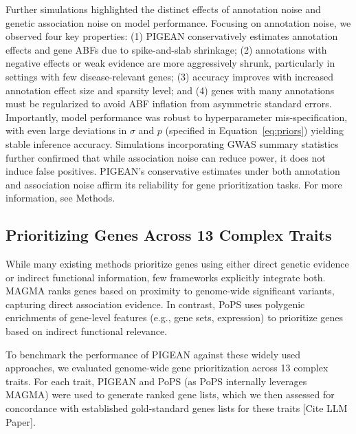 \documentclass[sn-nature,lineno]{sn-jnl}%
\theoremstyle{thmstyleone}%
\theoremstyle{thmstyletwo}%
\theoremstyle{thmstylethree}%
\begin{document}
Further simulations highlighted the distinct effects of annotation noise and genetic association noise on model performance. Focusing on annotation noise, we observed four key properties: (1) PIGEAN conservatively estimates annotation effects and gene ABFs due to spike-and-slab shrinkage; (2) annotations with negative effects or weak evidence are more aggressively shrunk, particularly in settings with few disease-relevant genes; (3) accuracy improves with increased annotation effect size and sparsity level; and (4) genes with many annotations must be regularized to avoid ABF inflation from asymmetric standard errors. Importantly, model performance was robust to hyperparameter mis-specification, with even large deviations in $\sigma$ and $p$ (specified in Equation~\ref{eq:priors}) yielding stable inference accuracy. Simulations incorporating GWAS summary statistics further confirmed that while association noise can reduce power, it does not induce false positives. PIGEAN’s conservative estimates under both annotation and association noise affirm its reliability for gene prioritization tasks. For more information, see Methods.

\subsection{Prioritizing Genes Across 13 Complex Traits} \label{sec:validation-real}
While many existing methods prioritize genes using either direct genetic evidence or indirect functional information, few frameworks explicitly integrate both. MAGMA \cite{leeuw_magma_2015} ranks genes based on proximity to genome-wide significant variants, capturing direct association evidence. In contrast, PoPS \cite{weeks_leveraging_2023} uses polygenic enrichments of gene-level features (e.g., gene sets, expression) to prioritize genes based on indirect functional relevance.


To benchmark the performance of PIGEAN against these widely used approaches, we evaluated genome-wide gene prioritization across 13 complex traits. For each trait, PIGEAN and PoPS (as PoPS internally leverages MAGMA) were used to generate ranked gene lists, which we then assessed for concordance with established gold-standard genes lists for these traits [Cite LLM Paper].
\end{document}
